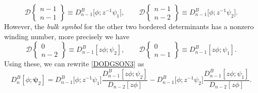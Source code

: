 \documentclass[10pt,a4paper]{amsart}
\numberwithin{equation}{section}
\begin{document}
	\begin{equation}\label{easy btds}
		\mathscr{D}\left\lbrace \begin{matrix} n-1 \\ n-1 \end{matrix} \right\rbrace \equiv D^B_{n-1}\big[\phi;z^{-1}\psi_1\big], \qquad \mathscr{D}\left\lbrace \begin{matrix} n-1 \\ n-2 \end{matrix} \right\rbrace \equiv D^B_{n-1}\big[\phi;z^{-1}\psi_2\big].
	\end{equation}
	However, the \textit{bulk symbol} for the other two bordered determinants has a nonzero winding number, more precisely we have
	\begin{equation}\label{harder btds}
		\mathscr{D}\left\lbrace \begin{matrix} 0 \\ n-2 \end{matrix} \right\rbrace \equiv D^B_{n-1}[z\phi;\psi_2], \qquad \mathscr{D}\left\lbrace \begin{matrix} 0 \\ n-1 \end{matrix} \right\rbrace \equiv D^B_{n-1}[z\phi;\psi_1].
	\end{equation}
	Using these, we can rewrite \eqref{DODGSON3} as
	\begin{equation}\label{Dodgson 2-bordered}
		D^B_n[\phi;\boldsymbol{\psi}_2] = D^B_{n-1}\big[\phi;z^{-1}\psi_1\big] \frac{D^B_{n-1}[z\phi;\psi_2]}{D_{n-2}[z \phi]} - D^B_{n-1}\big[\phi;z^{-1}\psi_2\big] \frac{D^B_{n-1}[z\phi;\psi_1]}{D_{n-2}[z \phi]}.
	\end{equation}
	
\end{document}
